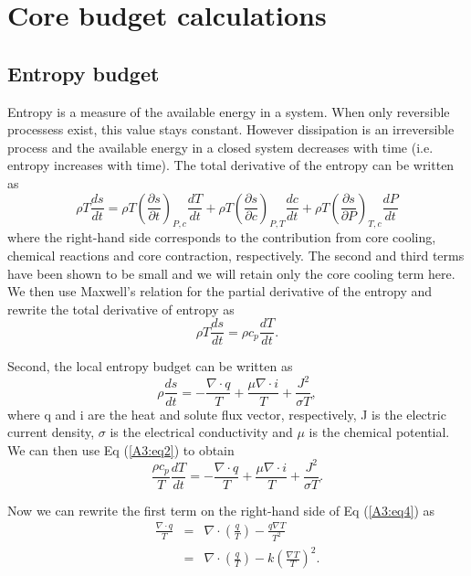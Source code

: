 \chapter{Core budget calculations}
\label{chap:A3}

\section{Entropy budget}

Entropy is a measure of the available energy in a system. When only reversible processess exist, this
value stays constant. However dissipation is an irreversible process and the available energy in a 
closed system decreases with time (i.e. entropy increases with time).
The total derivative of the entropy can be written as
%
\begin{equation}
\rho T \frac{ds}{dt} = \rho T \left(\frac{\partial s}{\partial t}\right)_{P,c} \frac{dT}{dt}
	+ \rho T \left(\frac{\partial s}{\partial c}\right)_{P,T} \frac{dc}{dt}
	+ \rho T \left(\frac{\partial s}{\partial P}\right)_{T,c} \frac{dP}{dt}
\end{equation}
where the right-hand side corresponds to the contribution from core cooling, chemical reactions and 
core contraction, respectively. The second and third terms have been shown to be small \cite[e.g.,][]{Nimmo:2007tw} 
and we will retain only the core cooling term here. We then use Maxwell's relation for the partial
derivative of the entropy and rewrite the total derivative of entropy as
%
\begin{equation}
\rho T \frac{ds}{dt} = \rho c_p \frac{dT}{dt}. 
\label{A3:eq2}
\end{equation}

Second, the local entropy budget can be written as \citep[e.g.,][]{Gubbins:2004ba}
%
\begin{equation}
\rho \frac{ds}{dt} = - \frac{\nabla \cdot q}{T} + \frac{\mu \nabla \cdot i}{T} + \frac{J^2}{\sigma T},
\end{equation}
%
where q and i are the heat and solute flux vector, respectively, J is the electric current density, $\sigma$ is 
the electrical conductivity and $\mu$ is the chemical potential. We can then use Eq (\ref{A3:eq2}) to obtain
%
\begin{equation}
\frac{\rho c_p}{T} \frac{dT}{dt} = 	- \frac{\nabla \cdot q}{T} 
									+ \frac{\mu \nabla \cdot i}{T} 
									+ \frac{J^2}{\sigma T}.
\label{A3:eq4}
\end{equation}

Now we can rewrite the first term on the right-hand side of Eq (\ref{A3:eq4}) as
%
\begin{eqnarray}
\frac{\nabla \cdot q}{T} &=& \nabla \cdot \left(\frac{q}{T}\right) - \frac{q \nabla T}{T^2} \nonumber \\
				 &=& \nabla \cdot \left(\frac{q}{T}\right) - k \left(\frac{\nabla T}{T}\right)^2.
\end{eqnarray}


